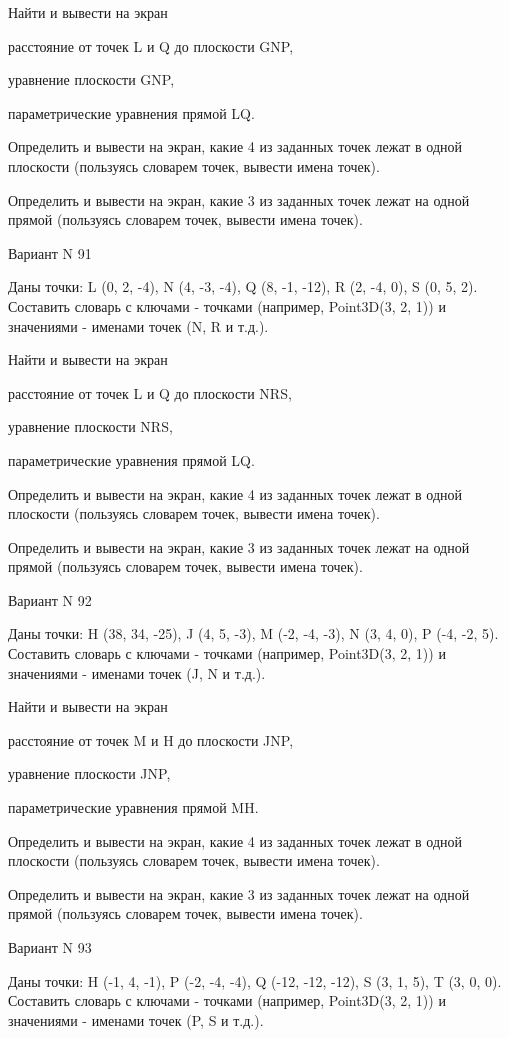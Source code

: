 \documentclass[11pt]{report}
\begin{document}
Найти и вывести на экран


расстояние от точек L и Q до плоскости GNP,


уравнение плоскости GNP,


параметрические уравнения прямой LQ.


Определить и вывести на экран, какие 4 из заданных точек лежат в одной плоскости (пользуясь словарем точек, вывести имена точек).


Определить и вывести на экран, какие 3 из заданных точек лежат на одной прямой (пользуясь словарем точек, вывести имена точек).

\newpage
Вариант N 91

Даны точки: L (0, 2, -4), N (4, -3, -4), Q (8, -1, -12), R (2, -4, 0), S (0, 5, 2).
Составить словарь с ключами - точками (например, Point3D(3, 2, 1)) и значениями - именами точек (N, R и т.д.).


Найти и вывести на экран


расстояние от точек L и Q до плоскости NRS,


уравнение плоскости NRS,


параметрические уравнения прямой LQ.


Определить и вывести на экран, какие 4 из заданных точек лежат в одной плоскости (пользуясь словарем точек, вывести имена точек).


Определить и вывести на экран, какие 3 из заданных точек лежат на одной прямой (пользуясь словарем точек, вывести имена точек).

\newpage
Вариант N 92

Даны точки: H (38, 34, -25), J (4, 5, -3), M (-2, -4, -3), N (3, 4, 0), P (-4, -2, 5).
Составить словарь с ключами - точками (например, Point3D(3, 2, 1)) и значениями - именами точек (J, N и т.д.).


Найти и вывести на экран


расстояние от точек M и H до плоскости JNP,


уравнение плоскости JNP,


параметрические уравнения прямой MH.


Определить и вывести на экран, какие 4 из заданных точек лежат в одной плоскости (пользуясь словарем точек, вывести имена точек).


Определить и вывести на экран, какие 3 из заданных точек лежат на одной прямой (пользуясь словарем точек, вывести имена точек).

\newpage
Вариант N 93

Даны точки: H (-1, 4, -1), P (-2, -4, -4), Q (-12, -12, -12), S (3, 1, 5), T (3, 0, 0).
Составить словарь с ключами - точками (например, Point3D(3, 2, 1)) и значениями - именами точек (P, S и т.д.).
\end{document}
